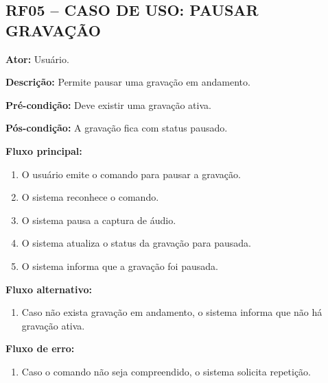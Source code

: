 \documentclass[12pt,oneside,a4paper,brazil,final]{abntex2}
\begin{document}
\clearpage
\subsection*{RF05 -- CASO DE USO: PAUSAR GRAVAÇÃO}



\textbf{Ator:} Usuário.



\textbf{Descrição:} Permite pausar uma gravação em andamento.



\textbf{Pré-condição:} Deve existir uma gravação ativa.



\textbf{Pós-condição:} A gravação fica com status pausado.



\textbf{Fluxo principal:}

\begin{enumerate}

    \item O usuário emite o comando para pausar a gravação.

    \item O sistema reconhece o comando.

    \item O sistema pausa a captura de áudio.

    \item O sistema atualiza o status da gravação para pausada.

    \item O sistema informa que a gravação foi pausada.

\end{enumerate}



\textbf{Fluxo alternativo:}

\begin{enumerate}

    \item Caso não exista gravação em andamento, o sistema informa que não há gravação ativa.

\end{enumerate}



\textbf{Fluxo de erro:}

\begin{enumerate}

    \item Caso o comando não seja compreendido, o sistema solicita repetição.

\end{enumerate}
\end{document}
